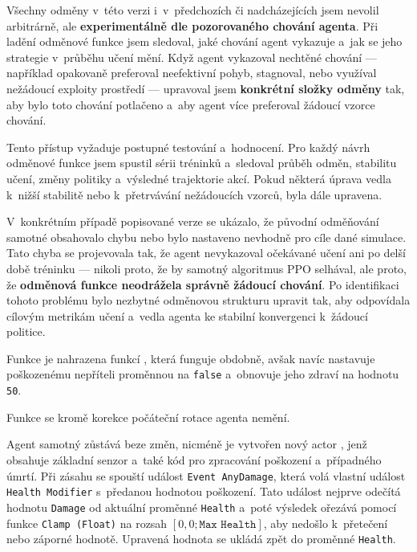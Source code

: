 Všechny odměny v~této verzi i~v~předchozích či nadcházejících jsem nevolil arbitrárně, ale \textbf{experimentálně dle pozorovaného chování agenta}. Při ladění odměnové funkce jsem sledoval, jaké chování agent vykazuje a~jak se jeho strategie v~průběhu učení mění. Když agent vykazoval nechtěné chování — například opakovaně preferoval neefektivní pohyb, stagnoval, nebo využíval nežádoucí exploity prostředí — upravoval jsem \textbf{konkrétní složky odměny} tak, aby bylo toto chování potlačeno a~aby agent více preferoval žádoucí vzorce chování.

\newpage

Tento přístup vyžaduje postupné testování a~hodnocení. Pro každý návrh odměnové funkce jsem spustil sérii tréninků a~sledoval průběh odměn, stabilitu učení, změny politiky a~výsledné trajektorie akcí. Pokud některá úprava vedla k~nižší stabilitě nebo k~přetrvávání nežádoucích vzorců, byla dále upravena.

V~konkrétním případě popisované verze se ukázalo, že původní odměňování samotné obsahovalo chybu nebo bylo nastaveno nevhodně pro cíle dané simulace. Tato chyba se projevovala tak, že agent nevykazoval očekávané učení ani po delší době tréninku — nikoli proto, že by samotný algoritmus PPO selhával, ale proto, že \textbf{odměnová funkce neodrážela správně žádoucí chování}. Po identifikaci tohoto problému bylo nezbytné odměnovou strukturu upravit tak, aby odpovídala cílovým metrikám učení a~vedla agenta ke stabilní konvergenci k~žádoucí politice.

Funkce  je nahrazena funkcí , která funguje obdobně, avšak navíc nastavuje poškozenému nepříteli proměnnou  na \texttt{false} a~obnovuje jeho zdraví na hodnotu \texttt{50}.

Funkce  se kromě korekce počáteční rotace agenta nemění.

Agent samotný zůstává beze změn, nicméně je vytvořen nový actor , jenž obsahuje základní  senzor a~také kód pro zpracování poškození a~případného úmrtí. Při zásahu se spouští událost \texttt{Event AnyDamage}, která volá vlastní událost \texttt{Health Modifier} s~předanou hodnotou poškození. Tato událost nejprve odečítá hodnotu \texttt{Damage} od aktuální proměnné \texttt{Health} a~poté výsledek ořezává pomocí funkce \texttt{Clamp (Float)} na rozsah $[0{,}0; \texttt{Max Health}]$, aby nedošlo k~přetečení nebo záporné hodnotě. Upravená hodnota se ukládá zpět do proměnné \texttt{Health}.

